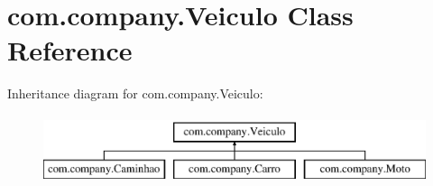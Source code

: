 \hypertarget{classcom_1_1company_1_1_veiculo}{}\section{com.\+company.\+Veiculo Class Reference}
\label{classcom_1_1company_1_1_veiculo}
Inheritance diagram for com.\+company.\+Veiculo\+:\begin{figure}[H]
\begin{center}
\leavevmode
\includegraphics[height=2.000000cm]{classcom_1_1company_1_1_veiculo}
\end{center}
\end{figure}
